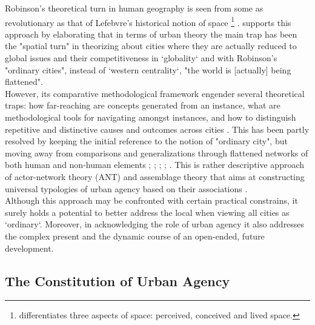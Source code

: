 \documentclass[11pt]{report}
\begin{document}
Robinson's theoretical turn in human geography is seen from some as revolutionary as that of Lefebvre's historical notion of space
\footnote{\href{Lefebvre}{\cite{Lefebvre_Production_1974}} differentiates  three aspects of space: perceived, conceived and lived space.}
\href{Chapelin}{\citealt{gintrac_les_2014}}.
\cite{Fraser_Globalization_2006} supports this approach by elaborating that  in  terms  of  urban  theory  the  main  trap  has  been  the "spatial  turn"  in  theorizing  about  cities  where  they  are  actually  reduced  to  global  issues  and  their competitiveness  in  ‘globality‘ and with Robinson's "ordinary cities", instead of ‘western centrality‘, "the world is [actually] being flattened".
\\

However, its comparative methodological framework engender several theoretical traps: how far-reaching are concepts generated from an instance, what are methodological tools for navigating amongst instances, and how to distinguish repetitive and distinctive causes and outcomes across cities \href{Robinson}{\cite{Robinson_Comparative_2015}}.
This has been partly resolved by keeping the initial reference to the notion of "ordinary city", but moving away from comparisons and generalizations through flattened networks of both human and non-human elements
 \href{Robinson}{\citealt{Robinson2004}};
\href{Sassen}{\cite{Sassen2008}}; \href{McFarlane}{\cite{McFarlane2010}}; \href{Farias}{\cite{FariasAndBender2011}}; \href{Rankin}{\cite{Rankin2011}}.
This is rather descriptive approach of actor-network theory (ANT) and assemblage theory that aims at constructing universal typologies of urban agency based on their associations \cite{Scott and Storper 2015}.
\\

Although this approach may  be  confronted  with  certain practical constrains, it surely holds a potential to better address the local when viewing all cities as ‘ordinary‘. Moreover, in acknowledging the role of urban agency it also addresses the complex present and the dynamic course of an open-ended, future development. 

\subsection{The Constitution of Urban Agency}
\end{document}

